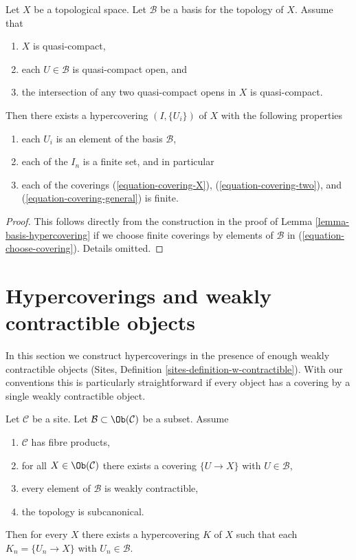 \begin{lemma}
\label{lemma-quasi-separated-quasi-compact-hypercovering}
Let $X$ be a topological space.
Let $\mathcal{B}$ be a basis for the topology of $X$.
Assume that
\begin{enumerate}
\item $X$ is quasi-compact,
\item each $U \in \mathcal{B}$ is quasi-compact open, and
\item the intersection of any two quasi-compact opens in
$X$ is quasi-compact.
\end{enumerate}
Then there exists a hypercovering $(I, \{U_i\})$ of $X$ with the
following properties
\begin{enumerate}
\item each $U_i$ is an element of the basis $\mathcal{B}$,
\item each of the $I_n$ is a finite set, and in particular
\item each of the coverings  (\ref{equation-covering-X}),
(\ref{equation-covering-two}), and (\ref{equation-covering-general})
is finite.
\end{enumerate}
\end{lemma}

\begin{proof}
This follows directly from the construction in the proof of
Lemma \ref{lemma-basis-hypercovering} if we choose finite coverings
by elements of $\mathcal{B}$ in (\ref{equation-choose-covering}).
Details omitted.
\end{proof}





\section{Hypercoverings and weakly contractible objects}
\label{section-w-contractible}

\noindent
In this section we construct hypercoverings in the presence of
enough weakly contractible objects
(Sites, Definition \ref{sites-definition-w-contractible}).
With our conventions this is particularly straightforward if
every object has a covering by a single weakly contractible object.

\begin{lemma}
\label{lemma-w-contractible}
Let $\mathcal{C}$ be a site. Let $\mathcal{B} \subset \Ob(\mathcal{C})$
be a subset. Assume
\begin{enumerate}
\item $\mathcal{C}$ has fibre products,
\item for all $X \in \Ob(\mathcal{C})$ there exists a covering
$\{U \to X\}$ with $U \in \mathcal{B}$,
\item every element of $\mathcal{B}$ is weakly contractible,
\item the topology is subcanonical.
\end{enumerate}
Then for every $X$ there exists a hypercovering $K$ of $X$
such that each $K_n = \{U_n \to X\}$ with $U_n \in \mathcal{B}$.
\end{lemma}

